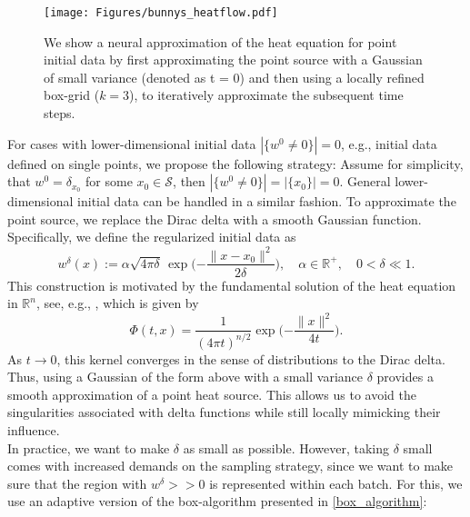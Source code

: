 \documentclass[12pt,openany]{book}
\def\S{\mathcal{S}}
\theoremstyle{plainnormal}
\theoremstyle{remark}
\begin{document}
\begin{figure}
    
    \texttt{[image: Figures/bunnys\_heatflow.pdf]}
    
\caption{We show a neural approximation of the heat equation for point initial data by first approximating the point source with a Gaussian of small variance (denoted as t = 0) and then using a locally refined box-grid ($k=3$), to iteratively approximate the subsequent time steps.} \label{point_bunny}
\end{figure}
For cases with lower-dimensional initial data $|\{w^0 \neq0\}| = 0$, e.g., initial data defined on single points, we propose the following strategy:
Assume for simplicity, that $w^0 = \delta_{x_0}$ for some $x_0\in\S$, then $|\{w^0 \neq0\}| = |\{x_0\}| = 0$. General lower-dimensional initial data can be handled in a similar fashion. To approximate the point source, we replace the Dirac delta with a smooth Gaussian function. Specifically, we define the regularized initial data as
\[
w^{\delta}(x) := \alpha \sqrt{4\pi\delta} \, \exp\Bigg({-\frac{\|x - x_0\|^2}{2\delta}}\Bigg), \quad \alpha \in \mathbb{R}^+, \quad 0 < \delta \ll 1.
\]
This construction is motivated by the fundamental solution of the heat equation in \( \mathbb{R}^n \), see, e.g., \cite{evans2}, which is given by
\[
\Phi(t, x) = \frac{1}{(4\pi t)^{n/2}} \exp\Big({-\frac{\|x\|^2}{4t}}\Big).
\]
As \( t \to 0 \), this kernel converges in the sense of distributions to the Dirac delta. Thus, using a Gaussian of the form above with a small variance \( \delta \) provides a smooth approximation of a point heat source. This allows us to avoid the singularities associated with delta functions while still locally mimicking their influence.\\
In practice, we want to make $\delta$ as small as possible. However, taking $\delta$ small comes with increased demands on the sampling strategy, since we want to make sure that the region with $w^\delta >> 0$ is represented within each batch. For this, we use an adaptive version of the box-algorithm presented in \cref{box_algorithm}: 
\end{document}
